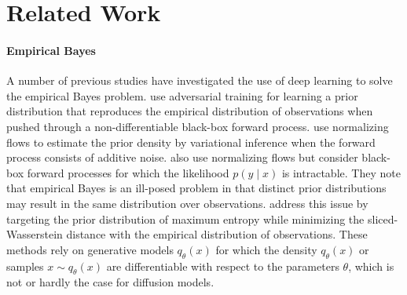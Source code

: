\section{Related Work} \label{sec:diem-related-work}

\paragraph{Empirical Bayes} A number of previous studies have investigated the use of deep learning to solve the empirical Bayes problem. \textcite{louppe2019adversarial} use adversarial training for learning a prior distribution that reproduces the empirical distribution of observations when pushed through a non-differentiable black-box forward process. \textcite{dockhorn2020density} use normalizing flows \cite{tabak2013family, rezende2015variational} to estimate the prior density by variational inference when the forward process consists of additive noise. \textcite{vandegar2021neural} also use normalizing flows but consider black-box forward processes for which the likelihood $p(y \mid x)$ is intractable. They note that empirical Bayes is an ill-posed problem in that distinct prior distributions may result in the same distribution over observations. \textcite{vetter2024sourcerer} address this issue by targeting the prior distribution of maximum entropy while minimizing the sliced-Wasserstein distance \cite{bonneel2015sliced, nadjahi2020statistical} with the empirical distribution of observations. These methods rely on generative models $q_\theta(x)$ for which the density $q_\theta(x)$ or samples $x \sim q_\theta(x)$ are differentiable with respect to the parameters $\theta$, which is not or hardly the case for diffusion models.

